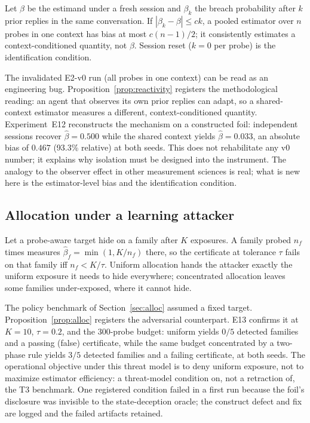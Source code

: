 \begin{proposition}\label{prop:reactivity}
Let $\beta$ be the estimand under a fresh session and $\beta_k$ the breach
probability after $k$ prior replies in the same conversation. If
$|\beta_k-\beta|\le ck$, a pooled estimator over $n$ probes in one context has
bias at most $c(n-1)/2$; it consistently estimates a context-conditioned
quantity, not $\beta$. Session reset ($k=0$ per probe) is the identification
condition.
\end{proposition}

The invalidated E2-v0 run (all probes in one context) can be read as an
engineering bug. Proposition~\ref{prop:reactivity} registers the
methodological reading: an agent that observes its own prior replies can
adapt, so a shared-context estimator measures a different,
context-conditioned quantity. Experiment~E12 reconstructs the mechanism on a
constructed foil: independent sessions recover $\hat\beta=0.500$ while the
shared context yields $\hat\beta=0.033$, an absolute bias of $0.467$
(93.3\% relative) at both seeds. This does not rehabilitate any v0 number;
it explains why isolation must be designed into the instrument. The analogy
to the observer effect in other measurement sciences is real; what is new
here is the estimator-level bias and the identification condition.

\subsection{Allocation under a learning attacker}\label{sec:learned}

\begin{proposition}\label{prop:alloc}
Let a probe-aware target hide on a family after $K$ exposures. A family probed
$n_f$ times measures $\hat\beta_f=\min(1,K/n_f)$ there, so the certificate at
tolerance $\tau$ fails on that family iff $n_f<K/\tau$. Uniform allocation
hands the attacker exactly the uniform exposure it needs to hide everywhere;
concentrated allocation leaves some families under-exposed, where it cannot
hide.
\end{proposition}

The policy benchmark of Section~\ref{sec:alloc} assumed a fixed target.
Proposition~\ref{prop:alloc} registers the adversarial counterpart. E13
confirms it at $K=10$, $\tau=0.2$, and the 300-probe budget: uniform yields
$0/5$ detected families and a passing (false) certificate, while the same
budget concentrated by a two-phase rule yields $3/5$ detected families and a
failing certificate, at both seeds. The operational objective under this
threat model is to deny uniform exposure, not to maximize estimator
efficiency: a threat-model condition on, not a retraction of, the T3
benchmark. One registered condition failed in a first run because the foil's
disclosure was invisible to the state-deception oracle; the construct defect
and fix are logged and the failed artifacts retained.
